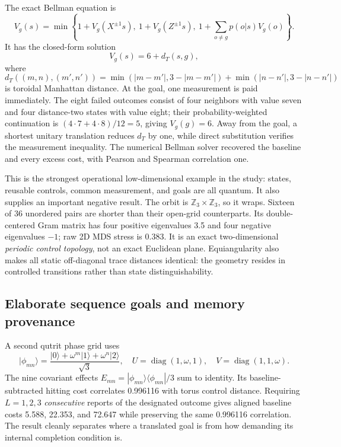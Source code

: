 \documentclass[11pt]{article}
\newcommand{\diag}{\operatorname{diag}}
\begin{document}
The exact Bellman equation is
\begin{equation}
 V_g(s)=\min\left\{
 1+V_g(X^{\pm1}s),\ 1+V_g(Z^{\pm1}s),\
 1+\sum_{o\ne g}p(o|s)V_g(o)\right\}. \label{eq:hesse-bellman}
\end{equation}
It has the closed-form solution
\begin{equation}
 V_g(s)=6+d_T(s,g), \label{eq:hesse-solution}
\end{equation}
where
\begin{equation}
 d_T((m,n),(m',n'))=
 \min(|m-m'|,3-|m-m'|)+
 \min(|n-n'|,3-|n-n'|) \label{eq:torus-manhattan}
\end{equation}
is toroidal Manhattan distance. At the goal, one measurement is paid
immediately. The eight failed outcomes consist of four neighbors with value
seven and four distance-two states with value eight; their probability-weighted
continuation is $(4\cdot7+4\cdot8)/12=5$, giving $V_g(g)=6$. Away from the
goal, a shortest unitary translation reduces $d_T$ by one, while direct
substitution verifies the measurement inequality. The numerical Bellman
solver recovered the baseline and every excess cost, with Pearson and Spearman
correlation one.

This is the strongest operational low-dimensional example in the study:
states, reusable controls, common measurement, and goals are all quantum. It
also supplies an important negative result. The orbit is
$\mathbb Z_3\times\mathbb Z_3$, so it wraps. Sixteen of 36 unordered pairs
are shorter than their open-grid counterparts. Its double-centered Gram
matrix has four positive eigenvalues 3.5 and four negative eigenvalues $-1$;
raw 2D MDS stress is 0.383. It is an exact two-dimensional \emph{periodic
control topology}, not an exact Euclidean plane. Equiangularity also makes all
static off-diagonal trace distances identical: the geometry resides in
controlled transitions rather than state distinguishability.

\subsection{Elaborate sequence goals and memory provenance}

A second qutrit phase grid uses
\begin{equation}
 |\phi_{mn}\rangle=\frac{|0\rangle+\omega^m|1\rangle+\omega^n|2\rangle}{\sqrt3},
 \quad U=\diag(1,\omega,1),\quad V=\diag(1,1,\omega).
 \label{eq:qutrit-phase-grid}
\end{equation}
The nine covariant effects
$E_{mn}=|\phi_{mn}\rangle\langle\phi_{mn}|/3$ sum to identity. Its
baseline-subtracted hitting cost correlates 0.996116 with torus control
distance. Requiring $L=1,2,3$ \emph{consecutive} reports of the designated
outcome gives aligned baseline costs 5.588, 22.353, and 72.647 while preserving
the same 0.996116 correlation. The result cleanly separates where a translated
goal is from how demanding its internal completion condition is.
\end{document}
